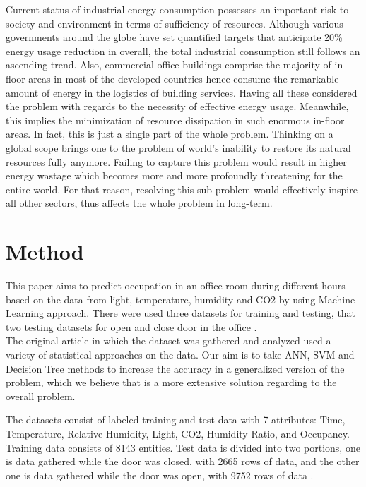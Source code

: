 \documentclass[conference]{IEEEtran}
\begin{document}
Current status
of industrial energy consumption possesses an important
risk to society and environment in terms of sufficiency of
resources. Although various governments around the
globe have set quantified targets that anticipate 20\%\cite{TargetCons} energy usage reduction in overall, the total industrial consumption still follows an ascending trend. Also, commercial office buildings comprise the majority of in-
floor areas in most of the developed countries hence consume the remarkable amount of energy in the logistics of building services. Having all these considered the problem with regards to the necessity of effective energy usage. Meanwhile, this implies the minimization of resource dissipation in such enormous in-floor areas. In fact, this is just a single part of the whole problem. Thinking on a global scope brings one to the problem of world's inability to restore its natural resources fully anymore. Failing to capture this problem would result in higher energy wastage which becomes more and more profoundly threatening for the entire world. For that reason, resolving this sub-problem would effectively
inspire all other sectors, thus affects the whole problem in long-term.

\section{Method}
This paper aims to predict occupation in an office room during different hours based on the data from light, temperature, humidity and CO2 by using Machine Learning approach. There were used three datasets for training and testing, that two testing datasets for open and close door in the office \cite{Candanedo}.\\


The original article in which the dataset was gathered and analyzed used a variety of statistical approaches on
the data. Our aim is to take ANN, SVM\cite{Erickson} and Decision Tree methods to increase the accuracy in a generalized version of the problem, which we believe that is a more extensive solution regarding to the overall problem.

The datasets consist of labeled training and test data with 7 attributes: Time, Temperature, Relative Humidity, Light, CO2, Humidity Ratio, and Occupancy. Training data consists of 8143 entities. Test data is divided into two portions, one is data gathered while the door was closed, with 2665 rows of data, and the other one is data gathered while the door was open, with 9752 rows of data \cite{Ryu}.
\end{document}
